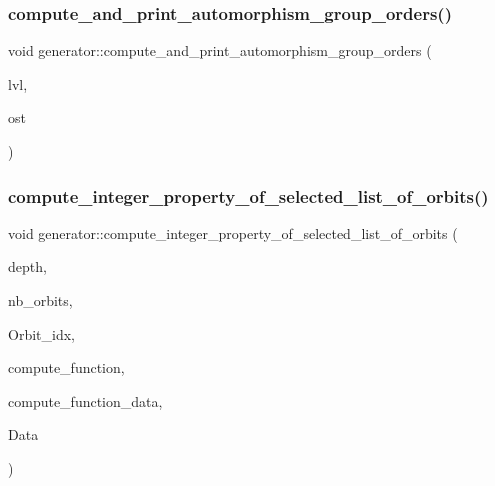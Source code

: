 \subsubsection{\texorpdfstring{compute\+\_\+and\+\_\+print\+\_\+automorphism\+\_\+group\+\_\+orders()}{compute\_and\_print\_automorphism\_group\_orders()}}
{\footnotesize\ttfamily void generator\+::compute\+\_\+and\+\_\+print\+\_\+automorphism\+\_\+group\+\_\+orders (\begin{DoxyParamCaption}\item[{\mbox{\hyperlink{galois_8h_a09fddde158a3a20bd2dcadb609de11dc}{I\+NT}}}]{lvl,  }\item[{ostream \&}]{ost }\end{DoxyParamCaption})}

\mbox{\label{classgenerator_addf0c8f228cdc9bb443446ba19acd983}} 
\subsubsection{\texorpdfstring{compute\+\_\+integer\+\_\+property\+\_\+of\+\_\+selected\+\_\+list\+\_\+of\+\_\+orbits()}{compute\_integer\_property\_of\_selected\_list\_of\_orbits()}}
{\footnotesize\ttfamily void generator\+::compute\+\_\+integer\+\_\+property\+\_\+of\+\_\+selected\+\_\+list\+\_\+of\+\_\+orbits (\begin{DoxyParamCaption}\item[{\mbox{\hyperlink{galois_8h_a09fddde158a3a20bd2dcadb609de11dc}{I\+NT}}}]{depth,  }\item[{\mbox{\hyperlink{galois_8h_a09fddde158a3a20bd2dcadb609de11dc}{I\+NT}}}]{nb\+\_\+orbits,  }\item[{\mbox{\hyperlink{galois_8h_a09fddde158a3a20bd2dcadb609de11dc}{I\+NT}} $\ast$}]{Orbit\+\_\+idx,  }\item[{\mbox{\hyperlink{galois_8h_a09fddde158a3a20bd2dcadb609de11dc}{I\+NT}}($\ast$)(\mbox{\hyperlink{galois_8h_a09fddde158a3a20bd2dcadb609de11dc}{I\+NT}} len, \mbox{\hyperlink{galois_8h_a09fddde158a3a20bd2dcadb609de11dc}{I\+NT}} $\ast$\mbox{\hyperlink{classgenerator_a5d2b65e2bd0e451744af1a47ba00bd96}{S}}, void $\ast$data)}]{compute\+\_\+function,  }\item[{void $\ast$}]{compute\+\_\+function\+\_\+data,  }\item[{\mbox{\hyperlink{galois_8h_a09fddde158a3a20bd2dcadb609de11dc}{I\+NT}} $\ast$\&}]{Data }\end{DoxyParamCaption})}

